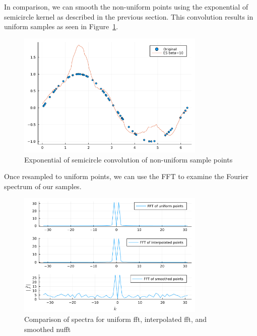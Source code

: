 In comparison, we can smooth the non-uniform points using the exponential of semicircle kernel as described in the previous section.
This convolution results in uniform samples as seen in Figure~\ref{fig:images-es-png}.
\begin{figure}[htpb]
    \centering
    \includegraphics[width=0.8\textwidth]{images/es.png}
    \caption{Exponential of semicircle convolution of non-uniform sample points}
    \label{fig:images-es-png}
\end{figure}

Once resampled to uniform points, we can use the FFT to examine the Fourier spectrum of our samples.
\begin{figure}[htpb]
    \centering
    \includegraphics[width=0.8\textwidth]{images/fft_comparison.png}
    \caption{Comparison of spectra for uniform fft, interpolated fft, and smoothed nufft}
    \label{fig:images-fft-png}
\end{figure}

